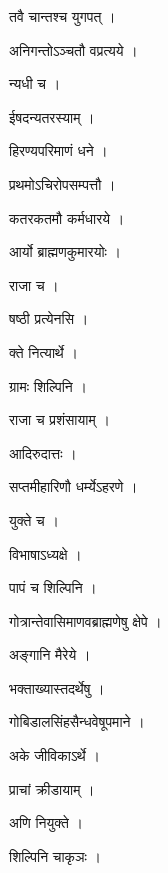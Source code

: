 \documentclass[10pt, openany]{book}
\begin{document}
\noindent तवै चान्तश्च युगपत् ।

\noindent अनिगन्तोऽञ्चतौ वप्रत्यये ।

\noindent न्यधी च ।

\noindent ईषदन्यतरस्याम् ।

\noindent हिरण्यपरिमाणं धने ।

\noindent प्रथमोऽचिरोपसम्पत्तौ ।

\noindent कतरकतमौ कर्मधारये ।

\noindent आर्यो ब्राह्मणकुमारयोः ।

\noindent राजा च ।

\noindent षष्ठी प्रत्येनसि ।

\noindent क्ते नित्यार्थे ।

\noindent ग्रामः शिल्पिनि ।

\noindent राजा च प्रशंसायाम् ।

\noindent आदिरुदात्तः ।

\noindent सप्तमीहारिणौ धर्म्येऽहरणे ।

\noindent युक्ते च ।

\noindent विभाषाऽध्यक्षे ।

\noindent पापं च शिल्पिनि ।

\noindent गोत्रान्तेवासिमाणवब्राह्मणेषु क्षेपे ।

\noindent अङ्गानि मैरेये ।

\noindent भक्ताख्यास्तदर्थेषु ।

\noindent गोबिडालसिंहसैन्धवेषूपमाने ।

\noindent अके जीविकाऽर्थे ।

\noindent प्राचां क्रीडायाम् ।

\noindent अणि नियुक्ते ।

\noindent शिल्पिनि चाकृञः ।
\end{document}
